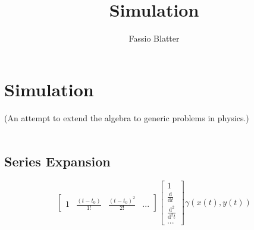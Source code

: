 \documentclass{report}
\begin{document}
\title{Simulation}
\author{Fassio Blatter}
\maketitle

\chapter{Simulation}
(An attempt to extend the algebra to generic problems in physics.)\\\\
\section{Series Expansion}
\begin{equation}
\begin{bmatrix}1 & \frac{(t-t_{0})}{1!} & \frac{(t-t_{0})^{2}}{2!} & ... \end{bmatrix}\begin{bmatrix}1 \\ \frac{\mathrm{d}}{\mathrm{d} t} \\ \frac{\mathrm{d}^2}{\mathrm{d}^2t} \\ ... \end{bmatrix} \gamma (x(t),y(t))
\end{equation}
\end{document}
